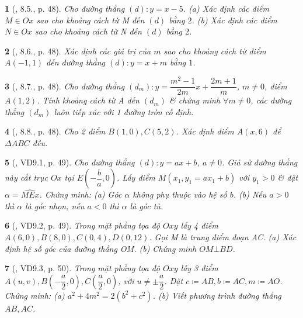 \documentclass{article}
\newtheorem{baitoan}{}
\begin{document}
\begin{baitoan}[\cite{TLCT_THCS_Toan_9_dai_so}, 8.5., p. 48]
	Cho đường thẳng $(d):y = x - 5$. (a) Xác định các điểm $M\in Ox$ sao cho khoảng cách từ M đến $(d)$ bằng $2$. (b) Xác định các điểm $N\in Ox$ sao cho khoảng cách từ N đến $(d)$ bằng $2$.
\end{baitoan}

\begin{baitoan}[\cite{TLCT_THCS_Toan_9_dai_so}, 8.6., p. 48]
	Xác định các giá trị của $m$ sao cho khoảng cách từ điểm $A(-1,1)$ đến đường thẳng $(d):y = x + m$ bằng $1$.
\end{baitoan}

\begin{baitoan}[\cite{TLCT_THCS_Toan_9_dai_so}, 8.7., p. 48]
	Cho đường thẳng $(d_m):y = \dfrac{m^2 - 1}{2m}x + \dfrac{2m + 1}{m}$, $m\ne0$, điểm $A(1,2)$. Tính khoảng cách từ A đến $(d_m)$ \& chứng minh $\forall m\ne0$, các đường thẳng $(d_m)$ luôn tiếp xúc với 1 đường tròn cố định.
\end{baitoan}

\begin{baitoan}[\cite{TLCT_THCS_Toan_9_dai_so}, 8.8., p. 48]
	Cho 2 điểm $B(1,0),C(5,2)$. Xác định điểm $A(x,6)$ để $\Delta ABC$ đều.
\end{baitoan}

\begin{baitoan}[\cite{TLCT_THCS_Toan_9_dai_so}, VD9.1, p. 49]
	Cho đường thẳng $(d):y = ax + b$, $a\ne0$. Giả sử đường thẳng này cắt trục $Ox$ tại $E\left(-\dfrac{b}{a},0\right)$. Lấy điểm $M(x_1,y_1 = ax_1 + b)$ với $y_1 > 0$ \& đặt $\alpha = \widehat{MEx}$. Chứng minh: (a) Góc $\alpha$ không phụ thuộc vào hệ số $b$. (b) Nếu $a > 0$ thì $\alpha$ là góc nhọn, nếu $a < 0$ thì $\alpha$ là góc tù.
\end{baitoan}

\begin{baitoan}[\cite{TLCT_THCS_Toan_9_dai_so}, VD9.2, p. 49]
	Trong mặt phẳng tọa độ $Oxy$ lấy 4 điểm $A(6,0),B(8,0),C(0,4),D(0,12)$. Gọi M là trung điểm đoạn AC. (a) Xác định hệ số góc của đường thẳng OM. (b) Chứng minh $OM\bot BD$.
\end{baitoan}

\begin{baitoan}[\cite{TLCT_THCS_Toan_9_dai_so}, VD9.3, p. 50]
	Trong mặt phẳng tọa độ $Oxy$ lấy 3 điểm $A(u,v),B\left(-\dfrac{a}{2},0\right),C\left(\dfrac{a}{2},0\right)$, với $u\ne\pm\dfrac{a}{2}$. Đặt $c\coloneqq AB,b\coloneqq AC,m\coloneqq AO$. Chứng minh: (a) $a^2 + 4m^2 = 2(b^2 + c^2)$. (b) Viết phương trình đường thẳng $AB,AC$.
\end{baitoan}
\end{document}

